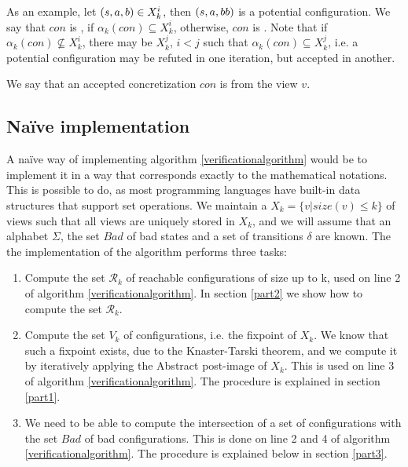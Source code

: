 As an example, let $(s, a, b) \in X_k^i$, then $(s, a, bb)$ is a potential configuration. We say that $con$ is , if $\alpha_k(con) \subseteq X_k^i$, otherwise, $con$ is . Note that if $\alpha_k(con) \not\subseteq X_k^i$, there may be $X_k^j$, $i < j$ such that $\alpha_k(con) \subseteq X_k^j$, i.e. a potential configuration may be refuted in one iteration, but accepted in another.

We say that an accepted concretization $con$ is  from the view $v$.

\subsection{Naïve implementation}
\label{apost}
A naïve way of implementing algorithm \ref{verificationalgorithm} would be to implement it in a way that corresponds exactly to the mathematical notations. This is possible to do, as most programming languages have built-in data structures that support set operations. We maintain a  $X_k = \{v | size(v) \leq k\}$ of views such that all views are uniquely stored in $X_k$, and we will assume that an alphabet $\Sigma$, the set $Bad$ of bad states and a set of transitions $\delta$ are known. The the implementation of the algorithm performs three tasks:

\begin{enumerate}
\item
Compute the set $\mathcal{R}_k$ of reachable configurations of size up to k, used on line 2 of algorithm \ref{verificationalgorithm}. In section \ref{part2} we show how to compute the set $\mathcal{R}_k$.

\item
Compute the set $V_k$ of configurations, i.e. the fixpoint of $X_k$. We know that such a fixpoint exists, due to the Knaster-Tarski theorem\cite{tarski}, and we compute it by iteratively applying the Abstract post-image of $X_k$. This is used on line 3 of algorithm \ref{verificationalgorithm}. The procedure is explained in section \ref{part1}.
\item
We need to be able to compute the intersection of a set of configurations with the set $Bad$ of bad configurations. This is done on line 2 and 4 of algorithm \ref{verificationalgorithm}. The procedure is explained below in section \ref{part3}.
\end{enumerate}

